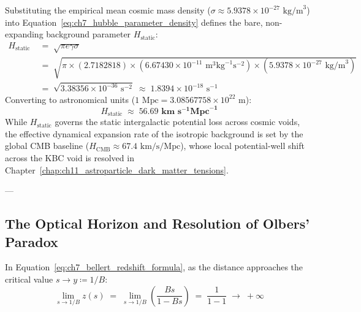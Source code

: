 \documentclass[
    12pt,
    a4paper,
    headings=normal,
    twoside=false,
    open=any,
    parskip=half
]{scrbook}
\begin{document}
\begin{physlemma}\label{lem:ch7_hubble_constant_evaluation}
Substituting the empirical mean cosmic mass density ($\sigma \approx 5.9378 \times 10^{-27}\text{ kg/m}^3$) into Equation~\eqref{eq:ch7_hubble_parameter_density} defines the bare, non-expanding background parameter $H_{\text{static}}$:
\begin{align*}
H_{\text{static}} &\;=\; \sqrt{\pi e \gamma \sigma} \\
&\;=\; \sqrt{\pi \times (2.7182818) \times (6.67430 \times 10^{-11} \text{ m}^3\text{kg}^{-1}\text{s}^{-2}) \times (5.9378 \times 10^{-27} \text{ kg/m}^3)} \\
&\;=\; \sqrt{3.38356 \times 10^{-36} \text{ s}^{-2}} \;\approx\; 1.8394 \times 10^{-18} \text{ s}^{-1}
\end{align*}
Converting to astronomical units ($1\text{ Mpc} = 3.08567758 \times 10^{22}\text{ m}$):
\begin{equation}
H_{\text{static}} \;\approx\; \mathbf{56.69 \text{ km} \text{ s}^{-1} \text{Mpc}^{-1}}
\label{eq:ch7_hubble_numerical_value}
\end{equation}
While $H_{\text{static}}$ governs the static intergalactic potential loss across cosmic voids, the effective dynamical expansion rate of the isotropic background is set by the global CMB baseline ($H_{\text{CMB}} \approx 67.4\text{ km/s/Mpc}$), whose local potential-well shift across the KBC void is resolved in Chapter~\ref{chap:ch11_astroparticle_dark_matter_tensions}.
\end{physlemma}

---

\subsection{The Optical Horizon and Resolution of Olbers' Paradox}

In Equation~\eqref{eq:ch7_bellert_redshift_formula}, as the distance approaches the critical value $s \to y \coloneqq 1/B$:
\begin{equation}
\lim_{s \to 1/B} z(s) \;=\; \lim_{s \to 1/B} \left( \frac{B s}{1 - B s} \right) \;=\; \frac{1}{1 - 1} \;\longrightarrow\; +\infty
\label{eq:ch7_optical_horizon_divergence}
\end{equation}
\end{document}
